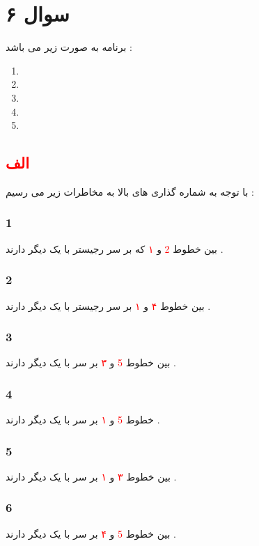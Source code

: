 \documentclass{article}
\begin{document}
\section*{سوال ۶}
برنامه به صورت زیر می باشد ‌‌:
\begin{center}
	\begin{enumerate}
		\item {}
		\item {}
		\item {}
		\item {}
		\item  {}
	\end{enumerate}
\end{center}
\subsection*{\textcolor{red}{الف}}
با توجه به شماره گذاری های بالا به مخاطرات زیر می رسیم  : 
\subsubsection*{1}
بین خطوط 
\textcolor{red}{2}
و 
\textcolor{red}{۱}
که بر سر رجیستر 
با یک دیگر 
\textcolor{blue}{}
دارند . 
\subsubsection*{2}
بین خطوط
\textcolor{red}{۴}
و 
\textcolor{red}{۱}
بر سر رجیستر 
با یک دیگر 
\textcolor{blue}{}
دارند . 
\subsubsection*{3}
بین خطوط 
\textcolor{red}{5}
و 
\textcolor{red}{۳}
بر سر 
با یک دیگر 
\textcolor{blue}{}
دارند  . 
\subsubsection*{4}
خطوط 
\textcolor{red}{5}
و
\textcolor{red}{۱}
بر سر 
با یک دیگر 
\textcolor{blue}{}
دارند  . 
\subsubsection*{5}
بین خطوط 
\textcolor{red}{۳}
و
\textcolor{red}{۱}
بر سر 
با یک دیگر 
\textcolor{blue}{}
دارند . 
\subsubsection*{6}
بین خطوط 
\textcolor{red}{5}
و
\textcolor{red}{۴}
بر سر 
با یک دیگر 
\textcolor{blue}{}
دارند . 
\end{document}
